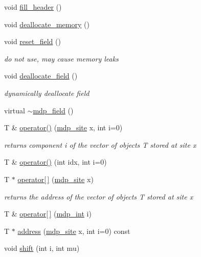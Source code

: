\begin{DoxyCompactItemize}
void \hyperlink{classmdp__field_ad3ad6161829f9bf07fc4dd607d71e0ea}{fill\+\_\+header} ()
\item 
void \hyperlink{classmdp__field_a3c2b219b116a0bb1cb340c3e06c37657}{deallocate\+\_\+memory} ()
\item 
void \hyperlink{classmdp__field_aa581ac8278d31ed9dabbff2df49c7130}{reset\+\_\+field} ()
\begin{DoxyCompactList}\small\item\em do not use, may cause memory leaks \end{DoxyCompactList}\item 
void \hyperlink{classmdp__field_ab063254fe74b88b1c9cc9e0cbc843b4b}{deallocate\+\_\+field} ()
\begin{DoxyCompactList}\small\item\em dynamically deallocate field \end{DoxyCompactList}\item 
virtual \hyperlink{classmdp__field_a98c85b56205d56d48ff740abb5d5cbb8}{$\sim$mdp\+\_\+field} ()
\item 
T \& \hyperlink{classmdp__field_a9eec94ee723253a196ccc4677832b4a0}{operator()} (\hyperlink{classmdp__site}{mdp\+\_\+site} x, int i=0)
\begin{DoxyCompactList}\small\item\em returns component i of the vector of objects T stored at site x \end{DoxyCompactList}\item 
T \& \hyperlink{classmdp__field_ab99b7a328e1fa4be857fe72d180b0b35}{operator()} (int idx, int i=0)
\item 
T $\ast$ \hyperlink{classmdp__field_a7dab126ffc90476401048cdf747077ef}{operator\mbox{[}$\,$\mbox{]}} (\hyperlink{classmdp__site}{mdp\+\_\+site} x)
\begin{DoxyCompactList}\small\item\em returns the address of the vector of objects T stored at site x \end{DoxyCompactList}\item 
T \& \hyperlink{classmdp__field_a97c56a74600b0d408ec24a161c4e8643}{operator\mbox{[}$\,$\mbox{]}} (\hyperlink{mdp__global__vars_8h_aaa1ad9d0dcd2124aa5af0120d9954174}{mdp\+\_\+int} i)
\item 
T $\ast$ \hyperlink{classmdp__field_a11f964e8fdfa1eae4e40ee31d2a9469c}{address} (\hyperlink{classmdp__site}{mdp\+\_\+site} x, int i=0) const
\item 
void \hyperlink{classmdp__field_a8ff0ae3336b70be5c58299322662275e}{shift} (int i, int mu)

\end{DoxyCompactItemize}
